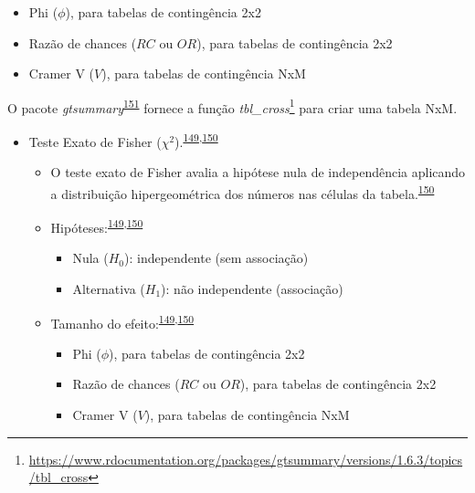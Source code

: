 \documentclass[
  a4paper,
]{book}
\renewcommand{\href}[2]{#2\footnote{\url{#1}}}
\newenvironment{infobox}[1]
  {
  \begin{itemize}
  \renewcommand{\labelitemi}{
    \raisebox{-.7\height}[0pt][0pt]{
      {\setkeys{Gin}{width=3em,keepaspectratio}
        \texttt{[image: \#1]}}
    }
  }
  \setlength{\fboxsep}{1em}
  \begin{blackbox}
  \item
  }
  {
  \end{blackbox}
  \end{itemize}
  }
\begin{document}
\begin{itemize}
\begin{itemize}
    \begin{itemize}
    \item
      Phi (\(\phi\)), para tabelas de contingência 2x2
    \item
      Razão de chances (\(RC\) ou \(OR\)), para tabelas de contingência 2x2
    \item
      Cramer V (\(V\)), para tabelas de contingência NxM
    \end{itemize}
  \end{itemize}
\end{itemize}

\begin{infobox}{images/Rlogo}
O pacote \emph{gtsummary}\textsuperscript{\protect\hyperlink{ref-gtsummary}{151}} fornece a função \href{https://www.rdocumentation.org/packages/gtsummary/versions/1.6.3/topics/tbl_cross}{\emph{tbl\_cross}} para criar uma tabela NxM.

\end{infobox}

\begin{itemize}
\item
  Teste Exato de Fisher (\(\chi^2\)).\textsuperscript{\protect\hyperlink{ref-McHugh2013}{149},\protect\hyperlink{ref-Kim2017a}{150}}

  \begin{itemize}
  \item
    O teste exato de Fisher avalia a hipótese nula de independência aplicando a distribuição hipergeométrica dos números nas células da tabela.\textsuperscript{\protect\hyperlink{ref-Kim2017a}{150}}
  \item
    Hipóteses:\textsuperscript{\protect\hyperlink{ref-McHugh2013}{149},\protect\hyperlink{ref-Kim2017a}{150}}

    \begin{itemize}
    \item
      Nula (\(H_{0}\)): independente (sem associação)
    \item
      Alternativa (\(H_{1}\)): não independente (associação)
    \end{itemize}
  \item
    Tamanho do efeito:\textsuperscript{\protect\hyperlink{ref-McHugh2013}{149},\protect\hyperlink{ref-Kim2017a}{150}}

    \begin{itemize}
    \item
      Phi (\(\phi\)), para tabelas de contingência 2x2
    \item
      Razão de chances (\(RC\) ou \(OR\)), para tabelas de contingência 2x2
    \item
      Cramer V (\(V\)), para tabelas de contingência NxM
    \end{itemize}
  \end{itemize}
\end{itemize}
\end{document}
